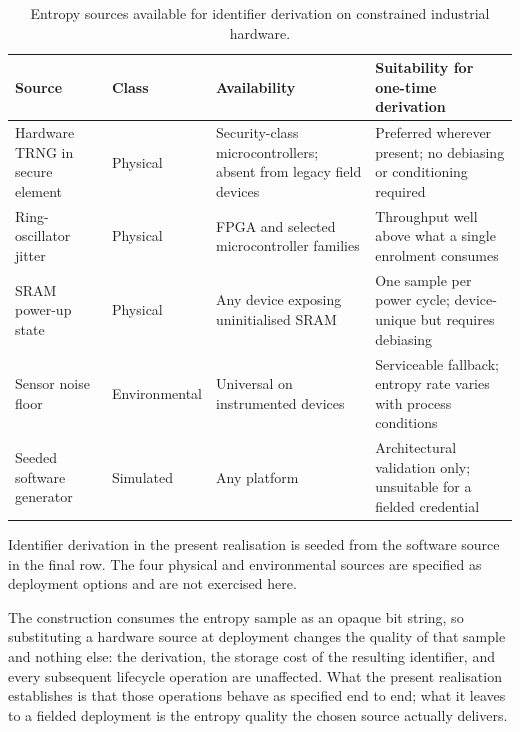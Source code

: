 \begin{table}[!htbp]
  \centering
  \footnotesize
  \setlength{\tabcolsep}{5pt}
  \renewcommand{\arraystretch}{1.3}
  \caption{Entropy sources available for identifier derivation on constrained industrial hardware.}
  \label{tab:entropy-sources}
  \begin{tabularx}{\textwidth}{@{}
      >{\raggedright\arraybackslash}p{2.8cm}
      >{\raggedright\arraybackslash}p{2.2cm}
      >{\raggedright\arraybackslash}p{3.4cm}
      >{\raggedright\arraybackslash}X@{}}
    \toprule
    \textbf{Source} & \textbf{Class} & \textbf{Availability} & \textbf{Suitability for one-time derivation} \\
    \midrule
    Hardware TRNG in secure element
      & Physical
      & Security-class microcontrollers; absent from legacy field devices
      & Preferred wherever present; no debiasing or conditioning required \\
    Ring-oscillator jitter
      & Physical
      & FPGA and selected microcontroller families
      & Throughput well above what a single enrolment consumes \\
    SRAM power-up state
      & Physical
      & Any device exposing uninitialised SRAM
      & One sample per power cycle; device-unique but requires debiasing \\
    Sensor noise floor
      & Environmental
      & Universal on instrumented devices
      & Serviceable fallback; entropy rate varies with process conditions \\
    Seeded software generator
      & Simulated
      & Any platform
      & Architectural validation only; unsuitable for a fielded credential \\
    \bottomrule
  \end{tabularx}
  \vspace{2pt}
  \footnotesize\raggedright
  Identifier derivation in the present realisation is seeded from the software source in the final row. The four physical and environmental sources are specified as deployment options and are not exercised here.
\end{table}

The construction consumes the entropy sample as an opaque bit string, so substituting a hardware source at deployment changes the quality of that sample and nothing else: the derivation, the storage cost of the resulting identifier, and every subsequent lifecycle operation are unaffected. What the present realisation establishes is that those operations behave as specified end to end; what it leaves to a fielded deployment is the entropy quality the chosen source actually delivers.

